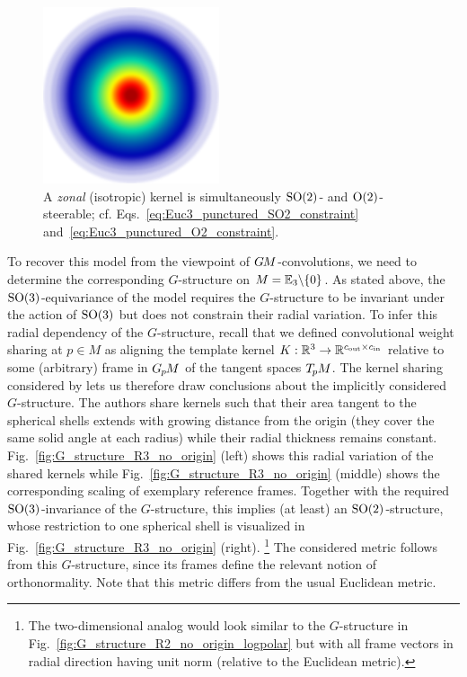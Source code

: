 \begin{figure}
    \vspace*{-3.ex}
    \centering
    \includegraphics[width=.8\linewidth]{figures/invariant_kernel.png}%
    \caption{\small
        A \emph{zonal} (isotropic) kernel is simultaneously $\operatorname{SO}(2)$- and $\operatorname{O}(2)$-steerable;
        cf. Eqs.~\eqref{eq:Euc3_punctured_SO2_constraint} and~\eqref{eq:Euc3_punctured_O2_constraint}.
        }
    \label{fig:zonal_kernel}
\end{figure}%
To recover this model from the viewpoint of $G\mkern-1.4muM$-convolutions, we need to determine the corresponding $G$-structure on $M = \mathbb{E}_3 \backslash \{0\}$.
As stated above, the $\operatorname{SO}(3)$-equivariance of the model requires the $G$-structure to be invariant under the action of $\operatorname{SO}(3)$ but does not constrain their radial variation.
To infer this radial dependency of the $G$-structure, recall that we defined convolutional weight sharing at $p\in M$ as aligning the template kernel $K: \mathbb{R}^3 \to \mathbb{R}^{{c_\textup{out}}\times{c_\textup{in}}}$ relative to some (arbitrary) frame in $G_{\mkern-1.3mu p}\mkern-1.2muM$ of the tangent spaces $T_{\mkern-1.5mu p}\mkern-.5muM$.
The kernel sharing considered by \citet{ramasinghe2019representation} lets us therefore draw conclusions about the implicitly considered $G$-structure.
The authors share kernels such that their area tangent to the spherical shells extends with growing distance from the origin (they cover the same solid angle at each radius) while their radial thickness remains constant.
Fig.~\ref{fig:G_structure_R3_no_origin} (left) shows this radial variation of the shared kernels while
Fig.~\ref{fig:G_structure_R3_no_origin} (middle) shows the corresponding scaling of exemplary reference frames.
Together with the required $\operatorname{SO}(3)$-invariance of the $G$-structure, this implies (at least) an $\operatorname{SO}(2)$-structure, whose restriction to one spherical shell is visualized in Fig.~\ref{fig:G_structure_R3_no_origin} (right).%
\footnote{
    The two-dimensional analog would look similar to the $G$-structure in Fig.~\ref{fig:G_structure_R2_no_origin_logpolar} but with all frame vectors in radial direction having unit norm (relative to the Euclidean metric).
}
The considered metric follows from this $G$-structure, since its frames define the relevant notion of orthonormality.
Note that this metric differs from the usual Euclidean metric.


